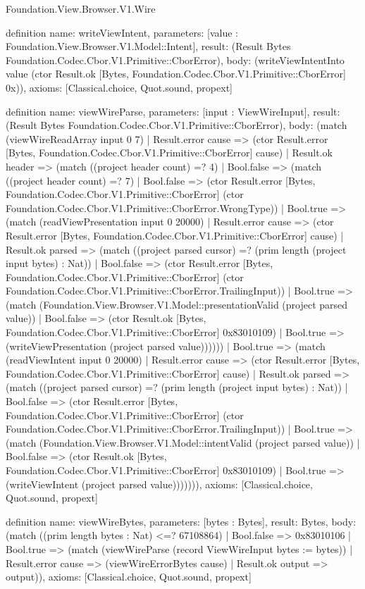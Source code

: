 \begin{lexlean}{Foundation.View.Browser.V1.Wire}
\begin{semanticmodule}
definition{
  name: writeViewIntent,
  parameters: [value : Foundation.View.Browser.V1.Model::Intent],
  result: (Result Bytes Foundation.Codec.Cbor.V1.Primitive::CborError),
  body: (writeViewIntentInto value (ctor Result.ok [Bytes, Foundation.Codec.Cbor.V1.Primitive::CborError] 0x)),
  axioms: [Classical.choice, Quot.sound, propext]
}

definition{
  name: viewWireParse,
  parameters: [input : ViewWireInput],
  result: (Result Bytes Foundation.Codec.Cbor.V1.Primitive::CborError),
  body: (match (viewWireReadArray input 0 7)
    | Result.error cause => (ctor Result.error [Bytes, Foundation.Codec.Cbor.V1.Primitive::CborError] cause)
    | Result.ok header => (match ((project header count) =? 4)
      | Bool.false => (match ((project header count) =? 7)
        | Bool.false => (ctor Result.error [Bytes, Foundation.Codec.Cbor.V1.Primitive::CborError] (ctor Foundation.Codec.Cbor.V1.Primitive::CborError.WrongType))
        | Bool.true => (match (readViewPresentation input 0 20000)
          | Result.error cause => (ctor Result.error [Bytes, Foundation.Codec.Cbor.V1.Primitive::CborError] cause)
          | Result.ok parsed => (match ((project parsed cursor) =? (prim length (project input bytes) : Nat))
            | Bool.false => (ctor Result.error [Bytes, Foundation.Codec.Cbor.V1.Primitive::CborError] (ctor Foundation.Codec.Cbor.V1.Primitive::CborError.TrailingInput))
            | Bool.true => (match (Foundation.View.Browser.V1.Model::presentationValid (project parsed value))
              | Bool.false => (ctor Result.ok [Bytes, Foundation.Codec.Cbor.V1.Primitive::CborError] 0x83010109)
              | Bool.true => (writeViewPresentation (project parsed value))))))
      | Bool.true => (match (readViewIntent input 0 20000)
        | Result.error cause => (ctor Result.error [Bytes, Foundation.Codec.Cbor.V1.Primitive::CborError] cause)
        | Result.ok parsed => (match ((project parsed cursor) =? (prim length (project input bytes) : Nat))
          | Bool.false => (ctor Result.error [Bytes, Foundation.Codec.Cbor.V1.Primitive::CborError] (ctor Foundation.Codec.Cbor.V1.Primitive::CborError.TrailingInput))
          | Bool.true => (match (Foundation.View.Browser.V1.Model::intentValid (project parsed value))
            | Bool.false => (ctor Result.ok [Bytes, Foundation.Codec.Cbor.V1.Primitive::CborError] 0x83010109)
            | Bool.true => (writeViewIntent (project parsed value))))))),
  axioms: [Classical.choice, Quot.sound, propext]
}

definition{
  name: viewWireBytes,
  parameters: [bytes : Bytes],
  result: Bytes,
  body: (match ((prim length bytes : Nat) <=? 67108864)
    | Bool.false => 0x83010106
    | Bool.true => (match (viewWireParse (record ViewWireInput {bytes := bytes}))
      | Result.error cause => (viewWireErrorBytes cause)
      | Result.ok output => output)),
  axioms: [Classical.choice, Quot.sound, propext]
}


\end{semanticmodule}
\end{lexlean}
